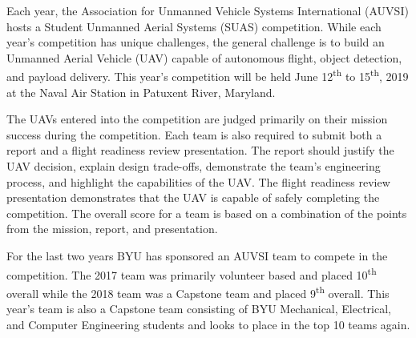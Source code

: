 
Each year, the Association for Unmanned Vehicle Systems International (AUVSI) hosts a Student Unmanned Aerial Systems (SUAS) competition. While each year's competition has unique challenges, the general challenge is to build an Unmanned Aerial Vehicle (UAV) capable of autonomous flight, object detection, and payload delivery. This year's competition will be held June 12\textsuperscript{th} to 15\textsuperscript{th}, 2019 at the Naval Air Station in Patuxent River, Maryland.

The UAVs entered into the competition are judged primarily on their mission success during the competition. Each team is also required to submit both a report and a flight readiness review presentation. The report should justify the UAV decision, explain design trade-offs, demonstrate the team's engineering process, and highlight the capabilities of the UAV. The flight readiness review presentation demonstrates that the UAV is capable of safely completing the competition. The overall score for a team is based on a combination of the points from the mission, report, and presentation.

For the last two years BYU has sponsored an AUVSI team to compete in the competition. The 2017 team was primarily volunteer based and placed 10\textsuperscript{th} overall while the 2018 team was a Capstone team and placed 9\textsuperscript{th} overall. This year's team is also a Capstone team consisting of BYU Mechanical, Electrical, and Computer Engineering students and looks to place in the top 10 teams again.